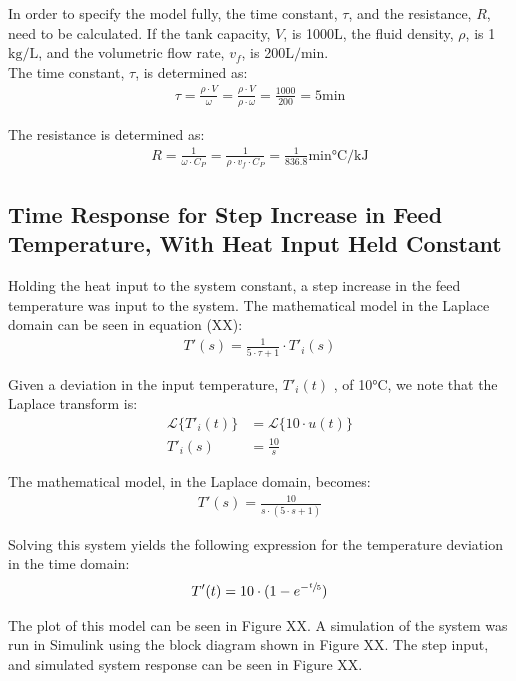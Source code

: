 \documentclass{article}
\begin{document}
In order to specify the model fully, the time constant, $\tau$, and the resistance, $R$, need to be calculated. If the tank capacity, $V$, is 1000$\si{\liter}$, the fluid density, $\rho$, is 1$\si{\kilogram\per\liter}$, and the volumetric flow rate, $v_f$, is 200$\si{\liter\per\minute}$.\\

The time constant, $\tau$, is determined as:
\begin{align}
\tau = \frac{\rho \cdot V}{\omega} = \frac{\rho \cdot V}{\rho \cdot \omega} = \frac{1000}{200} = 5\si{\minute}
\end{align}

The resistance is determined as:
\begin{align}
R = \frac{1}{\omega \cdot C_P} = \frac{1}{\rho \cdot v_f \cdot C_P} = \frac{1}{836.8}\si{\minute\degreeCelsius\per\kilo\joule}
\end{align}
\subsection{Time Response for Step Increase in Feed Temperature, With Heat Input Held Constant}
Holding the heat input to the system constant, a step increase in the feed temperature was input to the system. The mathematical model in the Laplace domain can be seen in equation (XX):
\begin{align}
T'(s) = \frac{1}{5 \cdot \tau + 1} \cdot T'_i(s)
\end{align} 

Given a deviation in the input temperature, $T'_i(t)$ , of 10$\si{\degreeCelsius}$, we note that the Laplace transform is:
\begin{align*}
\mathscr{L}\{T'_i(t)\} &= \mathscr{L}\{10 \cdot u(t)\}\\
T'_i(s) &= \frac{10}{s}
\end{align*}

The mathematical model, in the Laplace domain, becomes:
\begin{align}
T'(s) = \frac{10}{s \cdot (5 \cdot s + 1)}
\end{align}

Solving this system yields the following expression for the temperature deviation in the time domain:
\begin{align}
T'(t) = 10 \cdot (1 - e^{-\sfrac{t}{5}})
\end{align}

The plot of this model can be seen in Figure XX. A simulation of the system was run in Simulink using the block diagram shown in Figure XX. The step input, and simulated system response can be seen in Figure XX.
\end{document}
